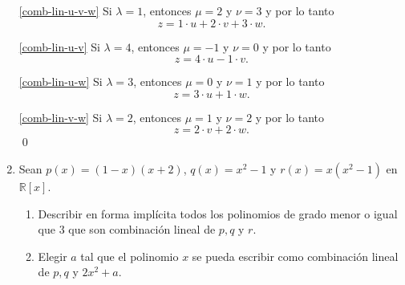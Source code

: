 \begin{enumerate}[resume, topsep=6pt, itemsep=.4cm]
    \ref{comb-lin-u-v-w} Si $\lambda=1$, entonces $\mu=2$ y $\nu=3$ y por lo tanto
    \begin{equation*}
        z=1\cdot u+2\cdot v+3\cdot w.
    \end{equation*}

    \ref{comb-lin-u-v} Si $\lambda=4$, entonces $\mu=-1$ y $\nu=0$ y por lo tanto
    \begin{equation*}
        z=4\cdot u-1\cdot v.
    \end{equation*}

    \ref{comb-lin-u-w} Si $\lambda=3$, entonces $\mu=0$ y $\nu=1$ y por lo tanto
    \begin{equation*}
        z=3\cdot u+1\cdot w.
    \end{equation*}

    \ref{comb-lin-v-w} Si $\lambda=2$, entonces $\mu=1$ y $\nu=2$ y por lo tanto
    \begin{equation*}
        z=2\cdot v+2\cdot w.
    \end{equation*}
    \qed     
    
    \item Sean $p(x)=(1-x)(x+2)$, $q(x)=x^2-1$ y $r(x)=x(x^2-1)$ en $\mathbb{R}[x]$.
        \begin{enumerate}
        \item\label{comb-lineal-pol-a} Describir en forma implícita todos los polinomios de grado menor o igual que $3$ que son combinación lineal de $p,q$ y $r$.
        \item\label{comb-lineal-pol-b} Elegir $a$ tal que el polinomio $x$ se pueda escribir como combinación lineal de $p,q$ y $2x^2+a$.
        \end{enumerate}
    
    \rta 


\end{enumerate}
